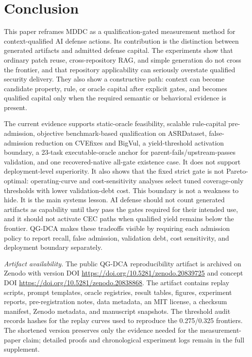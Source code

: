 ﻿\documentclass[lettersize,journal]{IEEEtran}
\begin{document}
\section{Conclusion}
This paper reframes MDDC as a qualification-gated measurement method for context-qualified AI defense actions. Its contribution is the distinction between generated artifacts and admitted defense capital. The experiments show that ordinary patch reuse, cross-repository RAG, and simple generation do not cross the frontier, and that repository applicability can seriously overstate qualified security delivery. They also show a constructive path: context can become candidate property, rule, or oracle capital after explicit gates, and becomes qualified capital only when the required semantic or behavioral evidence is present.

The current evidence supports static-oracle feasibility, scalable rule-capital pre-admission, objective benchmark-based qualification on ASRDataset, false-admission reduction on CVEfixes and BigVul, a yield-threshold activation boundary, a 23-task executable-oracle anchor for parent-fails/upstream-passes validation, and one recovered-native all-gate existence case. It does not support deployment-level superiority. It also shows that the fixed strict gate is not Pareto-optimal: operating-curve and cost-sensitivity analyses select tuned coverage-only thresholds with lower validation-debt cost. This boundary is not a weakness to hide. It is the main systems lesson. AI defense should not count generated artifacts as capability until they pass the gates required for their intended use, and it should not activate CEC paths when qualified yield remains below the frontier. QG-DCA makes these tradeoffs visible by requiring each admission policy to report recall, false admission, validation debt, cost sensitivity, and deployment boundary separately.

\textit{Artifact availability.} The public QG-DCA reproducibility artifact is archived on Zenodo with version DOI \url{https://doi.org/10.5281/zenodo.20839725} and concept DOI \url{https://doi.org/10.5281/zenodo.20838868}. The artifact contains replay scripts, prompt templates, oracle registries, result tables, figures, experiment reports, pre-registration notes, data metadata, an MIT license, a checksum manifest, Zenodo metadata, and manuscript snapshots. The threshold audit records hashes for the replay curves used to reproduce the 0.275/0.325 frontiers. The shortened version preserves only the evidence needed for the measurement-paper claim; detailed proofs and chronological experiment logs remain in the full supplement.
\end{document}
